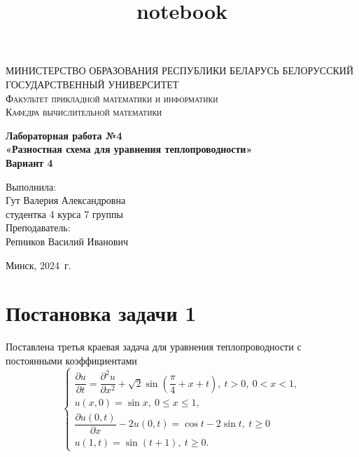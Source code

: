 \documentclass[a4paper, 12pt]{article}
\title{notebook}
\renewcommand{\d}{\partial}
\begin{document}
    
    	\begin{titlepage}
    		\begin{center}
    			\textsc{МИНИСТЕРСТВО ОБРАЗОВАНИЯ РЕСПУБЛИКИ БЕЛАРУСЬ БЕЛОРУССКИЙ ГОСУДАРСТВЕННЫЙ УНИВЕРСИТЕТ
    				\\[5mm]
    				Факультет прикладной математики и информатики\\[2mm]
    				Кафедра вычислительной математики
    			}
    			
    			\vfill
    			
    			\textbf{Лабораторная работа №4
    				\\[3mm]
    				«Разностная схема для уравнения теплопроводности»\\[6mm]
    				Вариант 4
    				\\[20mm]
    			}
    		\end{center}
    		
    		\hfill
    		\begin{minipage}{.4\textwidth}
    			Выполнила:\\[2mm] 
    			Гут Валерия Александровна\\
    			студентка 4 курса 7 группы\\[5mm]
    			
    			Преподаватель:\\[2mm] 
    			Репников Василий Иванович
    		\end{minipage}%
    		\vfill
    		\begin{center}
    			Минск, 2024\ г.
    		\end{center}
    	\end{titlepage}
    	
    	\newpage
    	\section*{Постановка задачи 1}
    	Поставлена третья краевая задача для уравнения теплопроводности с постоянными коэффициентами
    	\begin{equation}
    		\begin{cases}
    			\dfrac{\d u}{\d t} = \dfrac{\d ^2 u}{\d x^2} + \sqrt 2\sin \left(\dfrac \pi 4  + x + t\right),\ t>0,\ 0 < x < 1,\\
    			u(x,0) = \sin x,\ 0 \leq x \leq 1,\\
    			\dfrac{\d u(0,t)}{\d x} - 2u(0, t) = \cos t - 2 \sin t,\ t\geq 0\\ 
    			u(1,t) = \sin(t+1),\ t\geq 0.
    		\end{cases}
    	\end{equation}
\end{document}
